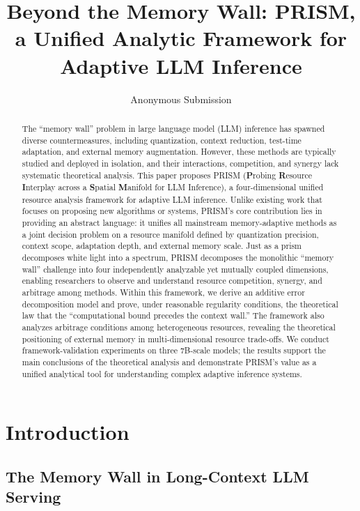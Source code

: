 \documentclass[11pt,a4paper]{article}
\title{Beyond the Memory Wall: PRISM, a Unified Analytic Framework for Adaptive LLM Inference}
\author{Anonymous Submission}
\date{}
\theoremstyle{plain}
\theoremstyle{definition}
\begin{document}
\maketitle

\begin{abstract}
The ``memory wall'' problem in large language model (LLM) inference has spawned diverse countermeasures, including quantization, context reduction, test-time adaptation, and external memory augmentation. However, these methods are typically studied and deployed in isolation, and their interactions, competition, and synergy lack systematic theoretical analysis. This paper proposes PRISM (\textbf{P}robing \textbf{R}esource \textbf{I}nterplay across a \textbf{S}patial \textbf{M}anifold for LLM Inference), a four-dimensional unified resource analysis framework for adaptive LLM inference. Unlike existing work that focuses on proposing new algorithms or systems, PRISM's core contribution lies in providing an abstract language: it unifies all mainstream memory-adaptive methods as a joint decision problem on a resource manifold defined by quantization precision, context scope, adaptation depth, and external memory scale. Just as a prism decomposes white light into a spectrum, PRISM decomposes the monolithic ``memory wall'' challenge into four independently analyzable yet mutually coupled dimensions, enabling researchers to observe and understand resource competition, synergy, and arbitrage among methods. Within this framework, we derive an additive error decomposition model and prove, under reasonable regularity conditions, the theoretical law that the ``computational bound precedes the context wall.'' The framework also analyzes arbitrage conditions among heterogeneous resources, revealing the theoretical positioning of external memory in multi-dimensional resource trade-offs. We conduct framework-validation experiments on three 7B-scale models; the results support the main conclusions of the theoretical analysis and demonstrate PRISM's value as a unified analytical tool for understanding complex adaptive inference systems.
\end{abstract}

\section{Introduction}

\subsection{The Memory Wall in Long-Context LLM Serving}
\end{document}
